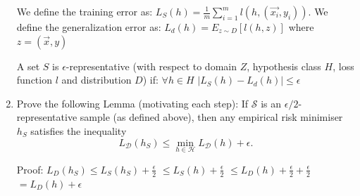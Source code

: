 \documentclass[a4paper,11pt,oneside]{book}
\begin{document}
\begin{enumerate}
\begin{solution}
                We define the training error as: $L_S(h) = \frac{1}{m}\sum_{i=1}^m l(h,(\vec{x_i},y_i))$.
                We define the generalization error as: $L_d(h) = E_{z\sim D}[l(h,z)]$ where $z = (\vec{x},y)$
                
                A set $S$ is $\epsilon$-representative (with respect to domain $Z$, hypothesis class $H$, loss function $l$ and distribution $D$) if: $\forall h \in H$ $|L_S(h) - L_d(h)| \leq \epsilon$
            \end{solution}
        \item Prove the following Lemma (motivating each step): If $\mathcal{S}$ is an $\epsilon/2$-representative sample (as defined above), then any empirical risk minimiser $h_S$ satisfies the inequality
            $$L_\mathcal{D}(h_S) \leq \min_{h\in\mathcal{H}} L_\mathcal{D}(h) + \epsilon.$$
                \begin{solution}
                    Proof:
                    $L_D(h_S) \leq L_S(h_S) + \frac{\epsilon}{2}$ 
                    $\leq L_S(h) + \frac{\epsilon}{2}$ 
                    $\leq L_D(h) + \frac{\epsilon}{2} + \frac{\epsilon}{2}$ 
                    $= L_D(h) + \epsilon$
                \end{solution}
    \end{enumerate}

\clearpage
\end{document}
